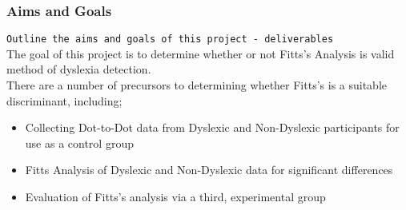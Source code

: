 		\subsubsection{Aims and Goals}
			\texttt{Outline the aims and goals of this project - deliverables}\\
			The goal of this project is to determine whether or not Fitts's Analysis is valid method of dyslexia detection.\\
			There are a number of precursors to determining whether Fitts's is a suitable discriminant, including;
			\begin{itemize}
				\item Collecting Dot-to-Dot data from Dyslexic and Non-Dyslexic participants for use as a control group
				\item Fitts Analysis of Dyslexic and Non-Dyslexic data for significant differences
				\item Evaluation of Fitts's analysis via a third, experimental group
			\end{itemize}
		
\newpage
